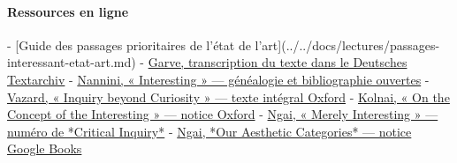 \documentclass[10pt,a4paper]{article}
\begin{document}
\paragraph{Ressources en ligne}
- [Guide des passages prioritaires de l'état de l'art](../../docs/lectures/passages-interessant-etat-art.md) - \href{\detokenize{https://www.deutschestextarchiv.de/book/show/garve_sammlung_1779}}{Garve, transcription du texte dans le Deutsches Textarchiv} - \href{\detokenize{https://lexicon.mimesisjournals.com/archive/2018/autumn/Interesting.pdf}}{Nannini, « Interesting » — généalogie et bibliographie ouvertes} - \href{\detokenize{https://academic.oup.com/pq/advance-article/doi/10.1093/pq/pqag014/8571347}}{Vazard, « Inquiry beyond Curiosity » — texte intégral Oxford} - \href{\detokenize{https://academic.oup.com/bjaesthetics/article/4/1/22/16793}}{Kolnai, « On the Concept of the Interesting » — notice Oxford} - \href{\detokenize{https://criticalinquiry.uchicago.edu/past_issues/issue/summer_2008_v34_n4/}}{Ngai, « Merely Interesting » — numéro de *Critical Inquiry*} - \href{\detokenize{https://books.google.com/books?id=Lyz3ugAACAAJ}}{Ngai, *Our Aesthetic Categories* — notice Google Books}
\end{document}

